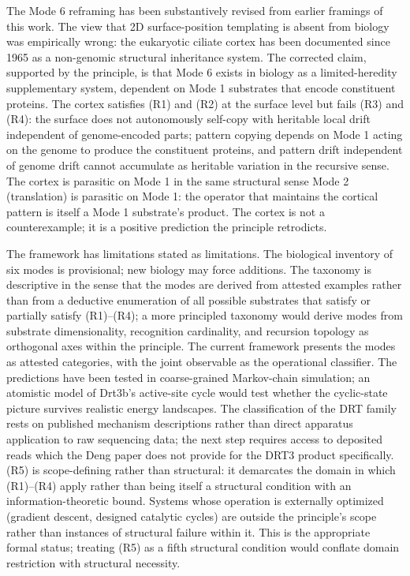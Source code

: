 \documentclass[aps,prx,reprint,amsmath,amssymb,floatfix,superscriptaddress,nofootinbib]{revtex4-2}
\theoremstyle{plain-thm}
\theoremstyle{definition-thm}
\begin{document}
The Mode 6 reframing has been substantively revised from earlier framings of this work. The view that 2D surface-position templating is absent from biology was empirically wrong: the eukaryotic ciliate cortex has been documented since 1965 as a non-genomic structural inheritance system. The corrected claim, supported by the principle, is that Mode 6 exists in biology as a limited-heredity supplementary system, dependent on Mode 1 substrates that encode constituent proteins. The cortex satisfies (R1) and (R2) at the surface level but fails (R3) and (R4): the surface does not autonomously self-copy with heritable local drift independent of genome-encoded parts; pattern copying depends on Mode 1 acting on the genome to produce the constituent proteins, and pattern drift independent of genome drift cannot accumulate as heritable variation in the recursive sense. The cortex is parasitic on Mode 1 in the same structural sense Mode 2 (translation) is parasitic on Mode 1: the operator that maintains the cortical pattern is itself a Mode 1 substrate's product. The cortex is not a counterexample; it is a positive prediction the principle retrodicts.

The framework has limitations stated as limitations. The biological inventory of six modes is provisional; new biology may force additions. The taxonomy is descriptive in the sense that the modes are derived from attested examples rather than from a deductive enumeration of all possible substrates that satisfy or partially satisfy (R1)--(R4); a more principled taxonomy would derive modes from substrate dimensionality, recognition cardinality, and recursion topology as orthogonal axes within the principle. The current framework presents the modes as attested categories, with the joint observable as the operational classifier. The predictions have been tested in coarse-grained Markov-chain simulation; an atomistic model of Drt3b's active-site cycle would test whether the cyclic-state picture survives realistic energy landscapes. The classification of the DRT family rests on published mechanism descriptions rather than direct apparatus application to raw sequencing data; the next step requires access to deposited reads which the Deng paper does not provide for the DRT3 product specifically. (R5) is scope-defining rather than structural: it demarcates the domain in which (R1)--(R4) apply rather than being itself a structural condition with an information-theoretic bound. Systems whose operation is externally optimized (gradient descent, designed catalytic cycles) are outside the principle's scope rather than instances of structural failure within it. This is the appropriate formal status; treating (R5) as a fifth structural condition would conflate domain restriction with structural necessity.
\end{document}
